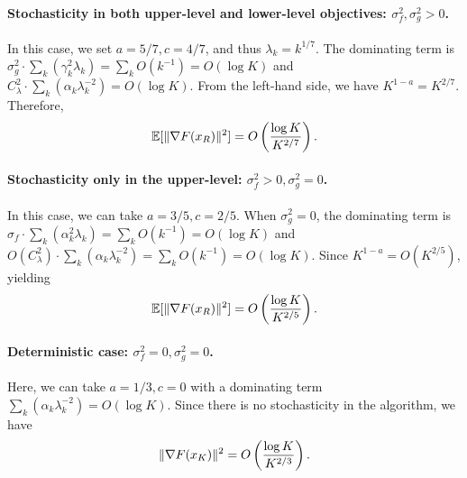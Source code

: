 \paragraph{Stochasticity in both upper-level and lower-level objectives: $\sigma_f^2, \sigma_g^2 > 0$.} In this case, we set $a = 5/7, c = 4/7$, and thus $\lambda_k = k^{1/7}$. The dominating term is $\sigma_g^2 \cdot \sum_k (\gamma_k^2 \lambda_k) = \sum_k O(k^{-1}) = O(\log K)$ and $C_\lambda^2 \cdot \sum_k(\alpha_k \lambda_k^{-2}) = O(\log K)$. From the left-hand side, we have $K^{1-a} = K^{2/7}$. Therefore,
\begin{align*}
    \mathbb{E}[\|\nabla F(x_R)\|^2] = O\left( \frac{\log K}{K^{2/7}} \right).
\end{align*}





\paragraph{Stochasticity only in the upper-level: $\sigma_f^2 > 0, \sigma_g^2 = 0$.}
In this case, we can take $a = 3/5, c = 2/5$. When $\sigma_g^2 = 0$, the dominating term is $\sigma_f \cdot \sum_k (\alpha_k^2 \lambda_k) = \sum_{k} O(k^{-1}) = O(\log K)$ and $O(C_\lambda^2) \cdot \sum_k (\alpha_k \lambda_k^{-2}) = \sum_{k} O(k^{-1}) = O(\log K)$. Since $K^{1-a} = O(K^{2/5})$, yielding
\begin{align*}
    \mathbb{E}[\|\nabla F(x_R)\|^2] = O\left( \frac{\log K}{K^{2/5}} \right).
\end{align*}


\paragraph{Deterministic case: $\sigma_f^2 = 0, \sigma_g^2 = 0$.}
Here, we can take $a = 1/3, c = 0$ with a dominating term $\sum_k (\alpha_k \lambda_k^{-2}) = O(\log K)$. Since there is no stochasticity in the algorithm, we have
\begin{align*}
    \|\nabla F(x_K)\|^2 = O\left( \frac{\log K}{K^{2/3}} \right).
\end{align*}











%


















